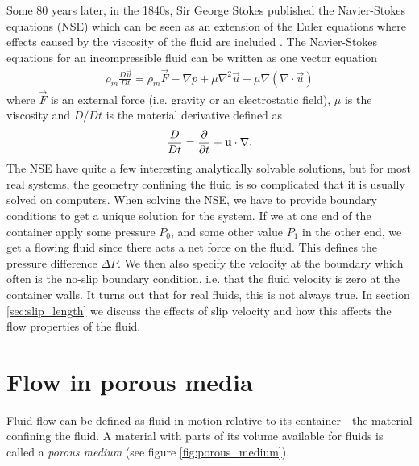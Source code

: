 Some 80 years later, in the 1840s, Sir George Stokes published the Navier-Stokes equations (NSE) which can be seen as an extension of the Euler equations where effects caused by the viscosity of the fluid are included \cite{batchelor2000introduction}. The Navier-Stokes equations for an incompressible fluid can be written as one vector equation
\begin{align}
	\label{eq:nse}
	\rho_m \frac{D\vec u}{ Dt} = \rho_m \vec F - \nabla p + \mu\nabla^2\vec u + \mu\nabla(\nabla\cdot \vec u)
\end{align}
where $\vec F$ is an external force (i.e. gravity or an electrostatic field), $\mu$ is the viscosity and $D/Dt$ is the material derivative defined as
\begin{align}
	\frac{D}{Dt} = \frac{\partial }{\partial t} + \mathbf u\cdot \nabla.
\end{align}
The NSE have quite a few interesting analytically solvable solutions, but for most real systems, the geometry confining the fluid is so complicated that it is usually solved on computers. When solving the NSE, we have to provide boundary conditions to get a unique solution for the system. If we at one end of the container apply some pressure $P_0$, and some other value $P_1$ in the other end, we get a flowing fluid since there acts a net force on the fluid. This defines the pressure difference $\Delta P$. We then also specify the velocity at the boundary which often is the no-slip boundary condition, i.e. that the fluid velocity is zero at the container walls. It turns out that for real fluids, this is not always true. In section \ref{sec:slip_length} we discuss the effects of slip velocity and how this affects the flow properties of the fluid. 
\section{Flow in porous media}
Fluid flow can be defined as fluid in motion relative to its container - the material confining the fluid. A material with parts of its volume available for fluids is called a \textit{porous medium} (see figure \ref{fig:porous_medium}).

